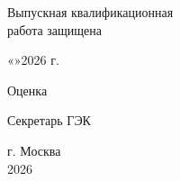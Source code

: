 \begin{titlepage}
\begin{flushright}
\begin{minipage}{0.46\textwidth}
Выпускная квалификационная\\
работа защищена

\vspace{0.15cm}

«\underline{\hspace{0.8cm}}»\underline{\hspace{2.5cm}}2026 г.

\vspace{0.18cm}

Оценка

\vspace{0.12cm}

\underline{\hspace{3.0cm}}

\vspace{0.18cm}

Секретарь ГЭК \underline{\hspace{2.2cm}}
\end{minipage}
\end{flushright}

\vfill

\begin{center}
г. Москва\\
2026
\end{center}
\end{titlepage}

